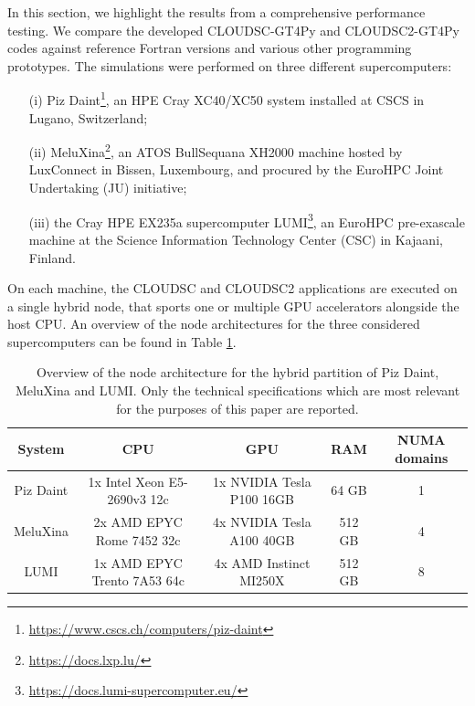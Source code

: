 \documentclass[gmd,manuscript,online]{copernicus}
\theoremstyle{theorem}
\theoremstyle{definition}
\theoremstyle{remark}
\theoremstyle{proposition}
\begin{document}
	In this section, we highlight the results from a comprehensive performance testing. We compare the developed CLOUDSC-GT4Py and CLOUDSC2-GT4Py codes against reference Fortran versions and various other programming prototypes. The simulations were performed on three different supercomputers:
	\begin{itemize}
		\item[(i)] Piz Daint\footnote{\url{https://www.cscs.ch/computers/piz-daint}}, an HPE Cray XC40/XC50 system installed at CSCS in Lugano, Switzerland;
		\item[(ii)] MeluXina\footnote{\url{https://docs.lxp.lu/}}, an ATOS BullSequana XH2000 machine hosted by LuxConnect in Bissen, Luxembourg, and procured by the EuroHPC Joint Undertaking (JU) initiative;
		\item[(iii)] the Cray HPE EX235a supercomputer LUMI\footnote{\url{https://docs.lumi-supercomputer.eu/}}, an EuroHPC pre-exascale machine at the Science Information Technology Center (CSC) in Kajaani, Finland.
	\end{itemize}
	On each machine, the CLOUDSC and CLOUDSC2 applications are executed on a single hybrid node, that sports one or multiple GPU accelerators alongside the host CPU. An overview of the node architectures for the three considered supercomputers can be found in Table \ref{tab:architecture}.

	\begin{table}[t!]
		\setlength\extrarowheight{2pt}
		\centering
		\begin{tabular}{|c|c|c|c|c|}
			\hline
			\textbf{System} & \textbf{CPU} & \textbf{GPU} & \textbf{RAM} & \textbf{NUMA domains} \\
			\hline
			Piz Daint & 1x Intel Xeon E5-2690v3 12c & 1x NVIDIA Tesla P100 16GB & 64 GB & 1 \\
			MeluXina & 2x AMD EPYC Rome 7452 32c & 4x NVIDIA Tesla A100 40GB & 512 GB & 4 \\
			LUMI & 1x AMD EPYC Trento 7A53 64c & 4x AMD Instinct MI250X & 512 GB & 8 \\
			\hline
		\end{tabular}
		\vspace*{0.2cm}
		\caption{Overview of the node architecture for the hybrid partition of Piz Daint, MeluXina and LUMI. Only the technical specifications which are most relevant for the purposes of this paper are reported.}
		\label{tab:architecture}
	\end{table}
\end{document}
